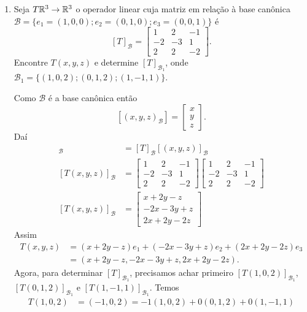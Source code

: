 \begin{exemplos}
\begin{enumerate}[label={\arabic*})]
  \item Seja $T \mathbb{R}^3 \to \mathbb{R}^3$ o operador linear cuja matriz em relação à base canônica $\mathcal{B} = \{e_1 = (1, 0, 0); e_2 = (0, 1, 0); e_3 = (0, 0, 1)\}$ é
    \[
      [T]_\mathcal{B} = \begin{bmatrix}1 & 2 & -1\\-2 & -3 & 1\\2 & 2 & -2\end{bmatrix}.
    \]
    Encontre $T(x, y, z)$ e determine $[T]_{\mathcal{B}_1}$, onde ${\mathcal{B}_1} = \{(1, 0, 2); (0, 1, 2); (1, -1, 1)\}$.
    \begin{solucao}
      Como $\mathcal{B}$ é a base canônica então
      \[
        [(x, y, z)_\mathcal{B}] = \begin{bmatrix}x\\y\\z\end{bmatrix}.
      \]
      Daí
      \begin{align*}
        [T(x, y, z)]_\mathcal{B} &= [T]_\mathcal{B}[(x, y, z)]_\mathcal{B}\\
        [T(x, y, z)]_\mathcal{B} &= \begin{bmatrix}1 & 2 & -1\\-2 & -3 & 1\\2 & 2 & -2\end{bmatrix}\begin{bmatrix}1 & 2 & -1\\-2 & -3 & 1\\2 & 2 & -2\end{bmatrix}\\
        [T(x, y, z)]_\mathcal{B} &= \begin{bmatrix}x + 2y - z\\-2x - 3y + z\\2x + 2y - 2z\end{bmatrix}
      \end{align*}
      Assim
      \begin{align*}
        T(x, y, z) &= (x + 2y - z)e_1 + (-2x - 3y + z)e_2 + (2x + 2y - 2z)e_3 \\ &= (x + 2y - z, -2x - 3y + z, 2x + 2y - 2z).
      \end{align*}
      Agora, para determinar $[T]_{\mathcal{B}_1}$, precisamos achar primeiro $[T(1, 0, 2)]_{\mathcal{B}_1}$, $[T(0, 1, 2)]_{\mathcal{B}_1}$ e $[T(1, -1, 1)]_{\mathcal{B}_1}$.
      Temos
      \begin{align*}
        T(1, 0, 2) &= (-1, 0, 2) = -1(1, 0, 2) + 0(0, 1, 2) + 0(1, -1, 1)\\

\end{align*}
\end{solucao}
\end{enumerate}
\end{exemplos}
